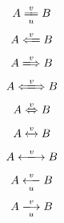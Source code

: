 \documentclass{article}
\begin{document}
\[ A \xlongequal[u]{v} B \]
\[ A \xLongleftarrow{v} B \]
\[ A \xLongrightarrow{v} B \]
\[ A \xLongleftrightarrow{v} B \]
\[ A \xLeftrightarrow{v} B \]
\[ A \xleftrightarrow{v} B \]
\[ A \xlongleftrightarrow{v} B \]
\[ A \xlongleftarrow[u]{v} B \]
\[ A \xlongrightarrow[u]{v} B \]
\end{document}

